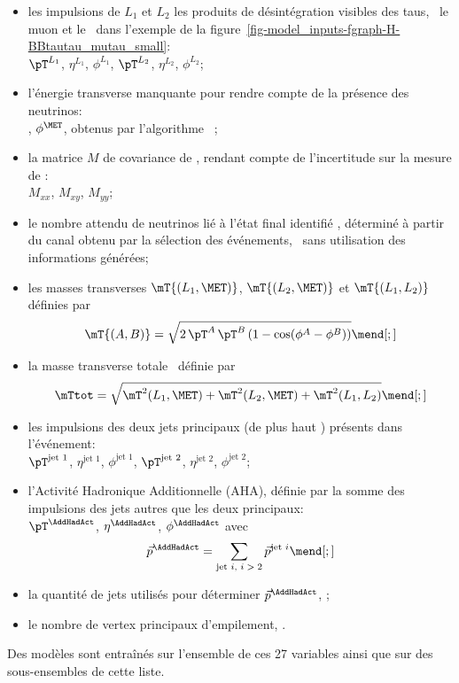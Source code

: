 \begin{itemize}
\item les impulsions de $L_1$ et $L_2$ les produits de désintégration visibles des taus,
\ie\ le muon et le \tauh\ dans l'exemple de la figure~\ref{fig-model_inputs-fgraph-H-BBtautau_mutau_small}:\\
$\pT^{L_1}$, $\eta^{L_1}$, $\phi^{L_1}$,
$\pT^{L_2}$, $\eta^{L_2}$, $\phi^{L_2}$;
\item l'énergie transverse manquante pour rendre compte de la présence des neutrinos:\\
\MET, $\phi^{\MET}$, obtenus par l'algorithme \PUPPI~\cite{PUPPI};
\item la matrice $M$ de covariance de \MET, rendant compte de l'incertitude sur la mesure de \MET:\\
$M_{xx}$, $M_{xy}$, $M_{yy}$;
\item le nombre attendu de neutrinos lié à l'état final identifié \Nnu,
déterminé à partir du canal obtenu par la sélection des événements, \ie\ sans utilisation des informations générées;
\item les masses transverses
$\mT {(L_1,\MET)}$,
$\mT {(L_2,\MET)}$ et
$\mT {(L_1,L_2)}$
définies par
\begin{equation}
\mT {(A,B)} = \sqrt{2 \, \pT^{A} \, \pT^{B} \, (1-\cos(\phi^A-\phi^B))}
\mend[;]
\end{equation}
\item la masse transverse totale \mTtot\ définie par
\begin{equation}
\mTtot = \sqrt{\mT^2 {(L_1,\MET)} + \mT^2 {(L_2,\MET)} + \mT^2 {(L_1,L_2)}}
\mend[;]
\end{equation}
\item les impulsions des deux jets principaux (de plus haut \pT) présents dans l'événement:\\
$\pT^\text{jet 1}$, $\eta^\text{jet 1}$, $\phi^\text{jet 1}$,
$\pT^\text{jet 2}$, $\eta^\text{jet 2}$, $\phi^\text{jet 2}$;
\item l'Activité Hadronique Additionnelle (AHA), définie par la somme des impulsions des jets autres que les deux principaux:\\
$\pT^{\AddHadAct}$, $\eta^{\AddHadAct}$, $\phi^{\AddHadAct}$ avec
\begin{equation}
\vec{p}^{\AddHadAct} = \sum_\text{jet $i$, $i > 2$} \vec{p}^\text{jet $i$}
\mend[;]
\end{equation}
\item la quantité de jets utilisés pour déterminer $\vec{p}^{\AddHadAct}$, \Njetsr;
\item le nombre de vertex principaux d'empilement, \Npu.
\end{itemize}
Des modèles sont entraînés sur l'ensemble de ces 27 variables ainsi que sur des sous-ensembles de cette liste.